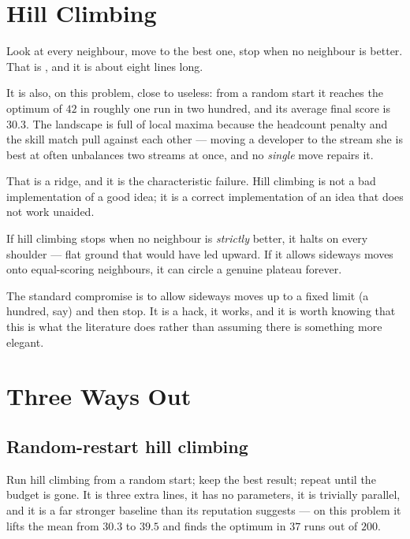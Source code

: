 \section{Hill Climbing}

Look at every neighbour, move to the best one, stop when no neighbour is better.
That is , and it is about eight lines long.

It is also, on this problem, close to useless: from a random start it reaches the
optimum of $42$ in roughly one run in two hundred, and its average final score is
$30.3$. The landscape is full of local maxima because the headcount penalty and the
skill match pull against each other --- moving a developer to the stream she is best
at often unbalances two streams at once, and no \emph{single} move repairs it.

That is a ridge, and it is the characteristic failure. Hill climbing is not a bad
implementation of a good idea; it is a correct implementation of an idea that does
not work unaided.

\begin{alertbox}
If hill climbing stops when no neighbour is \emph{strictly} better, it halts on
every shoulder --- flat ground that would have led upward. If it allows sideways
moves onto equal-scoring neighbours, it can circle a genuine plateau forever.

The standard compromise is to allow sideways moves up to a fixed limit (a hundred,
say) and then stop. It is a hack, it works, and it is worth knowing that this is
what the literature does rather than assuming there is something more elegant.
\end{alertbox}

\section{Three Ways Out}

\subsection{Random-restart hill climbing}

Run hill climbing from a random start; keep the best result; repeat until the budget
is gone. It is three extra lines, it has no parameters, it is trivially parallel, and
it is a far stronger baseline than its reputation suggests --- on this problem it
lifts the mean from $30.3$ to $39.5$ and finds the optimum in $37$ runs out of $200$.

